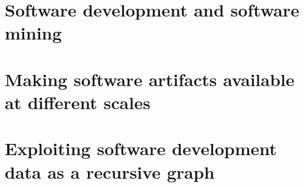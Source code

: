 \documentclass[a4paper,11pt]{memoir}
\begin{document}
\raggedbottom

\frontmatter
%

\clearemptydoublepage

%

\clearemptydoublepage
%

\clearemptydoublepage


\renewcommand{\contentsname}{Table of Contents}
\tableofcontents*
{}
%


\clearemptydoublepage

\iffalse
\listoftables
\addtocontents{lot}{\par\nobreak\textbf{{\scshape Table} \hfill Page}\par\nobreak}
\clearemptydoublepage
\listoffigures
\addtocontents{lof}{\par\nobreak\textbf{{\scshape Figure} \hfill Page}\par\nobreak}
\clearemptydoublepage
\fi
%
%
\mainmatter
%
\glsresetall


\part{Software development and software mining}







\part{Making software artifacts available at different scales}





\part{Exploiting software development data as a recursive graph}
\end{document}
